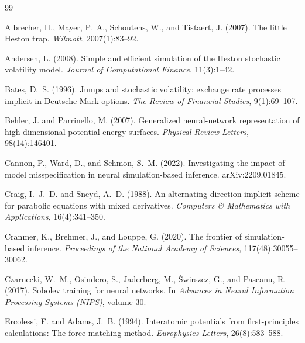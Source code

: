 \documentclass{article}
\begin{document}
\begin{thebibliography}{99}

Albrecher, H., Mayer, P.~A., Schoutens, W., and Tistaert, J. (2007).
\newblock The little Heston trap.
\newblock \emph{Wilmott}, 2007(1):83--92.
 
Andersen, L. (2008).
\newblock Simple and efficient simulation of the Heston stochastic volatility model.
\newblock \emph{Journal of Computational Finance}, 11(3):1--42.
 
Bates, D.~S. (1996).
\newblock Jumps and stochastic volatility: exchange rate processes implicit in
Deutsche Mark options.
\newblock \emph{The Review of Financial Studies}, 9(1):69--107.
 
Behler, J. and Parrinello, M. (2007).
\newblock Generalized neural-network representation of high-dimensional
potential-energy surfaces.
\newblock \emph{Physical Review Letters}, 98(14):146401.
 
Cannon, P., Ward, D., and Schmon, S.~M. (2022).
\newblock Investigating the impact of model misspecification in neural
simulation-based inference.
\newblock arXiv:2209.01845.

 
Craig, I.~J.~D. and Sneyd, A.~D. (1988).
\newblock An alternating-direction implicit scheme for parabolic equations with
mixed derivatives.
\newblock \emph{Computers \& Mathematics with Applications}, 16(4):341--350.

Cranmer, K., Brehmer, J., and Louppe, G. (2020).
\newblock The frontier of simulation-based inference.
\newblock \emph{Proceedings of the National Academy of Sciences},
117(48):30055--30062.
 
Czarnecki, W.~M., Osindero, S., Jaderberg, M., \'Swirszcz, G., and Pascanu, R. (2017).
\newblock Sobolev training for neural networks.
\newblock In \emph{Advances in Neural Information Processing Systems (NIPS)}, volume 30.

Ercolessi, F. and Adams, J.~B. (1994).
\newblock Interatomic potentials from first-principles calculations: The
force-matching method.
\newblock \emph{Europhysics Letters}, 26(8):583--588.


\end{thebibliography}
\end{document}
